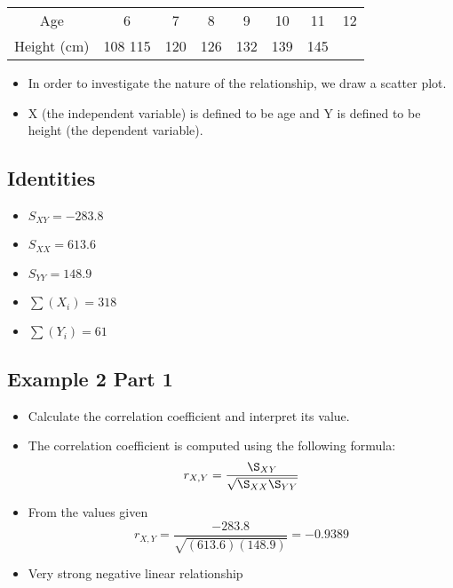 \begin{center}
	\begin{tabular}{|c|c|c|c|c|c|c|c|}
		Age  & 6 & 7  & 8 & 9 & 10 & 11 & 12 \\ 
		Height (cm)& 108 115& 120 &126& 132& 139 & 145\\
	\end{tabular} 
	
\end{center}

\begin{itemize}
	\item In order to investigate the nature of the relationship, we draw a
	scatter plot.
	\item X (the independent variable) is defined to be age and Y is defined
	to be height (the dependent variable).
\end{itemize}



\subsection{Identities}
\begin{itemize}
	\item $S_{XY} = -283.8$
	\item $S_{XX} = 613.6$
	\item $S_{YY} = 148.9$
	\item $\sum(X_i)  = 318 $
	\item $\sum(Y_i)  = 61$
\end{itemize}



\subsection{Example 2 Part 1}

\begin{itemize}
	\item Calculate the correlation coefficient and interpret its value.
	\item The correlation coefficient is computed using the following formula:
	\[ r_{X,Y} = \frac{\S_{XY}}{\sqrt{\S_{XX}\S_{YY}}} \]
	\item From the values given
	\[ r_{X,Y} = \frac{-283.8}{\sqrt{(613.6)(148.9)}} = -0.9389 \]
	\item Very strong negative linear relationship
\end{itemize}

